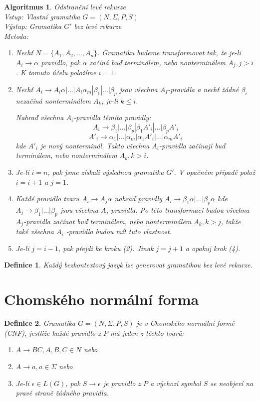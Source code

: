\documentclass[a4paper, 11pt]{report}
\newtheorem{mydef}{Definice}[chapter]
\newtheorem{alg}{Algoritmus}[chapter]
\begin{document}
\begin{alg}
Odstranění levé rekurze\\
Vstup: Vlastní gramatika $G = (N, \Sigma, P, S)$\\
Výstup: Gramatika $G'$ bez levé rekurze\\
Metoda:
\begin{enumerate}
	\item Nechť $N = \{A_1, A_2, \dots, A_n\}$. Gramatiku budeme transformovat tak, že je-li $A_i \to \alpha$ pravidlo, pak $\alpha$ začíná buď terminálem, nebo nonterminálem $A_j, j > i$. K tomuto účelu položíme $i = 1$.
	\item Nechť $A_i \to A_i \alpha | \dots | A_i \alpha_m | \beta_1 | \dots | \beta_p$ jsou všechna $A_I$-pravidla a nechť žádné $\beta_i$ nezačíná nonterminálem $A_k$, je-li $k \leq i$.

	Nahraď všechna $A_i$-pravidla těmito pravidly:
	$$A_i \to \beta_1 | \dots | \beta_p | \beta_1 A'_i | \dots | \beta_p A'_i$$
	$$A'_i \to \alpha_1 | \dots | \alpha_m | \alpha_1 A'_i | \dots | \alpha_m A'_i$$
	kde $A'_i$ je nový nonterminál. Takto všechna $A_i$-pravidla začínají buď terminálem, nebo nonterminálem $A_k, k > i$.
	\item Je-li $i = n$, pak jsme získali výslednou gramatiku $G'$. V opačném případě polož $i = i +1$ a $j = 1$.
	\item Každé pravidlo tvaru $A_i \to A_j \alpha$ nahraď pravidly $A_i \to \beta_1 \alpha | \dots | \beta_p \alpha$ kde $A_j \to \beta_1 | \dots | \beta_p$ jsou všechna $A_j$-pravidla. Po této transformaci budou všechna $A_j$-pravidla začínat buď terminálem, nebo nonterminálem $A_k, k > j$, takže také všechna $A_i$ -pravidla budou mít tuto vlastnost.
	\item Je-li $j = i - 1$, pak přejdi ke kroku (2). Jinak $j = j +1 $ a opakuj krok (4).
\end{enumerate}
\end{alg}

\begin{mydef}
Každý bezkontextový jazyk lze generovat gramatikou bez levé rekurze.
\end{mydef}

\section{Chomského normální forma}

\begin{mydef}
Gramatika $G = (N, \Sigma, P, S)$ je v \emph{Chomského normální formě} (CNF), jestliže každé pravidlo z $P$ má jeden z těchto tvarů:
\begin{enumerate}
	\item $A \to BC, A, B, C \in N$ nebo
	\item $A \to a, a \in \Sigma$ nebo
	\item Je-li $\epsilon \in L(G)$, pak $S \to \epsilon$ je pravidlo z $P$ a výchozí symbol $S$ se neobjeví na pravé straně žádného pravidla.
\end{enumerate}
\end{mydef}
\end{document}
